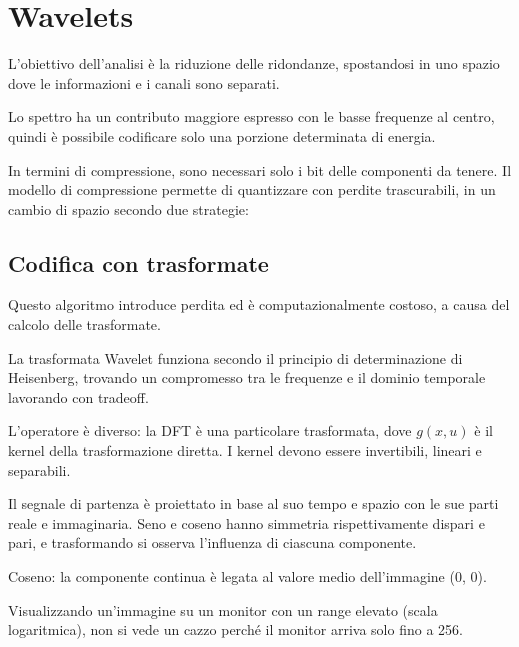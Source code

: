 \section{Wavelets}
L'obiettivo dell'analisi è la riduzione delle ridondanze, spostandosi in uno spazio dove le informazioni e i canali sono separati. 

Lo spettro ha un contributo maggiore espresso con le basse frequenze al centro, quindi è possibile codificare solo una porzione determinata di energia.

In termini di compressione, sono necessari solo i bit delle componenti da tenere. Il modello di compressione permette di quantizzare con perdite trascurabili, in un cambio di spazio secondo due strategie:

\subsection{Codifica con trasformate}
Questo algoritmo introduce perdita ed è computazionalmente costoso, a causa del calcolo delle trasformate. 

La trasformata Wavelet funziona secondo il principio di determinazione di Heisenberg, trovando un compromesso tra le frequenze e il dominio temporale lavorando con tradeoff.

L'operatore è diverso: la DFT è una particolare trasformata, dove $g(x, u)$ è il kernel della trasformazione diretta. I kernel devono essere invertibili, lineari e separabili.

Il segnale di partenza è proiettato in base al suo tempo e spazio con le sue parti reale e immaginaria. Seno e coseno hanno simmetria rispettivamente dispari e pari, e trasformando si osserva l'influenza di ciascuna componente. 

Coseno: la componente continua è legata al valore medio dell'immagine (0, 0). 

Visualizzando un'immagine su un monitor con un range elevato (scala logaritmica), non si vede un cazzo perché il monitor arriva solo fino a 256.




